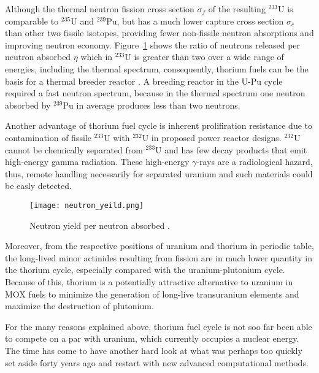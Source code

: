 Although the thermal neutron fission cross section $\sigma_f$ of the resulting $^{233}$U is comparable to $^{235}$U and $^{239}$Pu, but has a much lower capture cross section $\sigma_c$ than other two fissile isotopes, providing fewer non-fissile neutron absorptions and improving neutron economy. Figure~\ref{fig:n_yeild} shows the ratio of neutrons released per neutron absorbed $\eta$ which in $^{233}$U is greater than two over a wide range of energies, including the thermal spectrum, consequently, thorium fuels can be the basis for a thermal breeder reactor \cite{iaea_thorium_2005}. A breeding reactor in the U-Pu cycle required a fast neutron spectrum, because in the thermal spectrum one neutron absorbed by $^{239}$Pu in average produces less than two neutrons.

Another advantage of thorium fuel cycle is inherent prolifiration resistance due to contamination of fissile $^{233}$U with $^{232}$U in proposed power reactor designs. $^{232}$U cannot be chemically separated from $^{233}$U and has few decay products that emit high-energy gamma radiation. These high-energy $\gamma$-rays are a radiological hazard, thus, remote handling necessarily for separated uranium and such materials could be easly detected.

\begin{figure}[htbp!] %
  \centering
  \vspace{-0.3em}
  \texttt{[image: neutron\_yeild.png]}
  \caption{Neutron yield per neutron absorbed \cite{anon_plutonium_1989}.}
  \vspace{-0.6em}
  \label{fig:n_yeild}
\end{figure}
\FloatBarrier

Moreover, from the respective positions of uranium and thorium in periodic table, the long-lived minor actinides resulting from fission are in much lower quantity in the thorium cycle, especially compared with the uranium-plutonium cycle. Because of this, thorium is a potentially attractive alternative to uranium in \gls{MOX} fuels to minimize the generation of long-live transuranium elements and maximize the destruction of plutonium.

For the many reasons explained above, thorium fuel cycle is not soo far been able to compete on a par with uranium, which currently occupies a nuclear energy. The
time has come to have another hard look at what was perhaps too quickly set aside forty years ago and restart with new advanced computational methods. 

